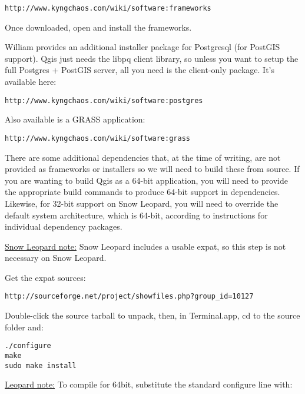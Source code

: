 \begin{verbatim}
http://www.kyngchaos.com/wiki/software:frameworks
\end{verbatim}

Once downloaded, open and install the frameworks.

William provides an additional installer package for Postgresql (for PostGIS support).
Qgis just needs the libpq client library, so unless you want to setup the full
Postgres + PostGIS server, all you need is the client-only package.
It's available here:

\begin{verbatim}
http://www.kyngchaos.com/wiki/software:postgres 
\end{verbatim}

Also available is a GRASS application:

\begin{verbatim}
http://www.kyngchaos.com/wiki/software:grass
\end{verbatim}

There are some additional dependencies that, at the time of writing, are not
provided as frameworks or installers so we will need to build these from source.
If you are wanting to build Qgis as a 64-bit application, you will need to 
provide the appropriate build commands to produce 64-bit support in dependencies.
Likewise, for 32-bit support on Snow Leopard, you will need to override the
default system architecture, which is 64-bit, according to instructions for
individual dependency packages.

\underline{Snow Leopard note:} Snow Leopard includes a usable expat, so this step is 
not necessary on Snow Leopard.

Get the expat sources:

\begin{verbatim}
http://sourceforge.net/project/showfiles.php?group_id=10127 
\end{verbatim}

Double-click the source tarball to unpack, then, in Terminal.app, cd to the source folder and:

\begin{verbatim}
./configure
make 
sudo make install 
\end{verbatim}

\underline{Leopard note:} To compile for 64bit, substitute the standard configure line with:

